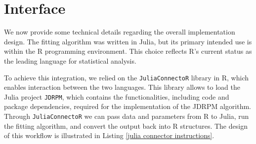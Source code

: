 \documentclass[12pt,	%
	a4paper,		%
	twoside,		%
	openright,		%
	titlepage,%
	]{book}
\theoremstyle{definition}
\let\cite\citep
\begin{document}
\section{Interface}
We now provide some technical details regarding the overall implementation design. The fitting algorithm was written in Julia, but its primary intended use is within the R programming environment. This choice reflects R's current status as the leading language for statistical analysis.

To achieve this integration, we relied on the \texttt{JuliaConnectoR} library \cite{juliaconnectoR} in R, which enables interaction between the two languages. This library allows to load the Julia project \texttt{JDRPM}, which contains the functionalities, including code and package dependencies, required for the implementation of the JDRPM algorithm. Through \texttt{JuliaConnectoR} we can pass data and parameters from R to Julia, run the fitting algorithm, and convert the output back into R structures. The design of this workflow is illustrated in Listing \ref{julia connector instructions}.


\end{document}
